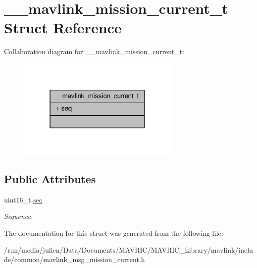 \hypertarget{struct____mavlink__mission__current__t}{\section{\+\_\+\+\_\+mavlink\+\_\+mission\+\_\+current\+\_\+t Struct Reference}
\label{struct____mavlink__mission__current__t}
}


Collaboration diagram for \+\_\+\+\_\+mavlink\+\_\+mission\+\_\+current\+\_\+t\+:
\nopagebreak
\begin{figure}[H]
\begin{center}
\leavevmode
\includegraphics[width=223pt]{struct____mavlink__mission__current__t__coll__graph}
\end{center}
\end{figure}
\subsection*{Public Attributes}
\begin{DoxyCompactItemize}
\item 
\hypertarget{struct____mavlink__mission__current__t_abf05ebfb452002e779838949ae335023}{uint16\+\_\+t \hyperlink{struct____mavlink__mission__current__t_abf05ebfb452002e779838949ae335023}{seq}}\label{struct____mavlink__mission__current__t_abf05ebfb452002e779838949ae335023}

\begin{DoxyCompactList}\small\item\em Sequence. \end{DoxyCompactList}\end{DoxyCompactItemize}


The documentation for this struct was generated from the following file\+:\begin{DoxyCompactItemize}
\item 
/run/media/julien/\+Data/\+Documents/\+M\+A\+V\+R\+I\+C/\+M\+A\+V\+R\+I\+C\+\_\+\+Library/mavlink/include/common/mavlink\+\_\+msg\+\_\+mission\+\_\+current.\+h\end{DoxyCompactItemize}
